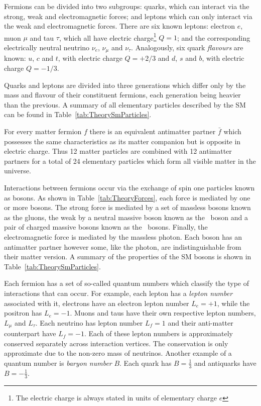 Fermions can be divided into two subgroups: quarks, which can interact via the strong, weak and electromagnetic forces; and leptons which can only interact via the weak and electromagnetic forces. There are six known leptons: electron $e$, muon $\mu$ and tau $\tau$, which all have electric charge\footnote{The electric charge is always stated in units of elementary charge $e$} $Q=1$; and the corresponding electrically neutral neutrino $\nu_e$, $\nu_\mu$ and $\nu_{\tau}$. Analogously, six quark \emph{flavours} are known: $u$, $c$ and $t$, with electric charge $Q=+2/3$ and $d$, $s$ and $b$, with electric charge $Q=-1/3$.

Quarks and leptons are divided into three generations which differ only by the mass and flavour of their constituent fermions, each generation being heavier than the previous. A summary of all elementary particles described by the SM can be found in Table~\ref{tab:TheorySmParticles}.

For every matter fermion $f$ there is an equivalent antimatter partner $\bar{f}$ which possesses the same characteristics as its matter companion but is opposite in electric charge. Thus 12 matter particles are combined with 12 antimatter partners for a total of 24 elementary particles which form all visible matter in the universe.

Interactions between fermions occur via the exchange of spin one particles known as bosons. As shown in Table~\ref{tab:TheoryForces}, each force is mediated by one or more bosons. The strong force is mediated by a set of massless bosons known as the gluons, the weak by a neutral massive boson known as the \Z\ boson and a pair of charged massive bosons known as the \W\ bosons. Finally, the electromagnetic force is mediated by the massless photon. Each boson has an antimatter partner however some, like the photon, are indistinguishable from their matter version. A summary of the properties of the SM bosons is shown in Table~\ref{tab:TheorySmParticles}.

Each fermion has a set of so-called quantum numbers which classify the type of interactions that can occur. For example, each lepton has a \emph{lepton number} associated with it, electrons have an electron lepton number $L_e=+1$, while the positron has $L_e=-1$. Muons and taus have their own respective lepton numbers, $L_{\mu}$ and $L_{\tau}$. Each neutrino has lepton number $L_{f}=1$ and their anti-matter counterpart have $L_f=-1$. Each of these lepton numbers is approximately conserved separately across interaction vertices. The conservation is only approximate due to the non-zero mass of neutrinos. Another example of a quantum number is \emph{baryon number} $B$. Each quark has $B=\frac{1}{3}$ and antiquarks have $B=-\frac{1}{3}$.

